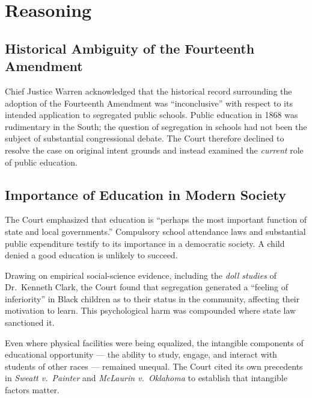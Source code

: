 \section{Reasoning}

\subsection{Historical Ambiguity of the Fourteenth Amendment}

Chief Justice Warren acknowledged that the historical record surrounding the adoption of
the Fourteenth Amendment was ``inconclusive'' with respect to its intended application to
segregated public schools.  Public education in 1868 was rudimentary in the South; the
question of segregation in schools had not been the subject of substantial congressional
debate.  The Court therefore declined to resolve the case on original intent grounds and
instead examined the \textit{current} role of public education.

\subsection{Importance of Education in Modern Society}

\setcounter{reasonstep}{0}
The Court emphasized that education is ``perhaps the most important function of state and
local governments.''  Compulsory school attendance laws and substantial public expenditure
testify to its importance in a democratic society.  A child denied a good education is
unlikely to succeed.

Drawing on empirical social-science evidence, including the \textit{doll studies} of
Dr.\ Kenneth Clark, the Court found that segregation generated a ``feeling of inferiority''
in Black children as to their status in the community, affecting their motivation to learn.
This psychological harm was compounded where state law sanctioned it.

Even where physical facilities were being equalized, the intangible components of
educational opportunity --- the ability to study, engage, and interact with students of other
races --- remained unequal.  The Court cited its own precedents in \textit{Sweatt v.\ Painter}
and \textit{McLaurin v.\ Oklahoma} to establish that intangible factors matter.

